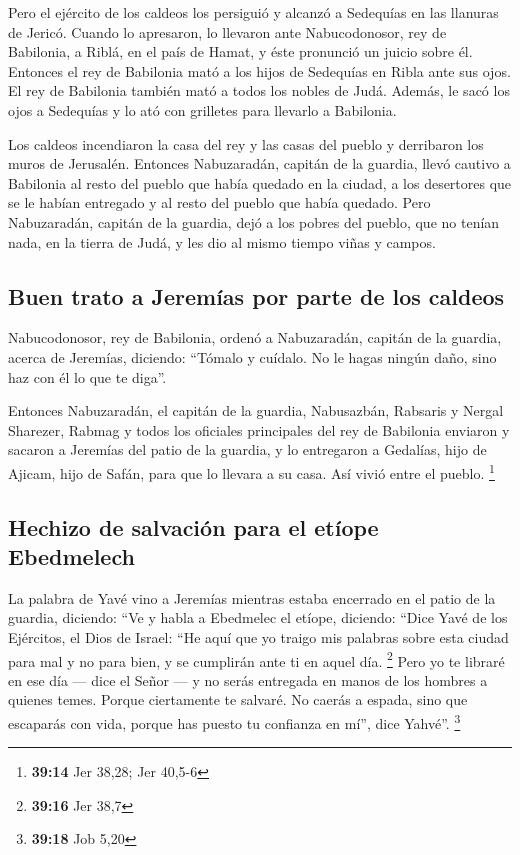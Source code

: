 \begin{paracol}{2}
 Pero el ejército de los caldeos los persiguió y alcanzó a
Sedequías en las llanuras de Jericó. Cuando lo apresaron, lo llevaron
ante Nabucodonosor, rey de Babilonia, a Riblá, en el país de Hamat, y
éste pronunció un juicio sobre él.  Entonces el rey de
Babilonia mató a los hijos de Sedequías en Ribla ante sus ojos. El rey
de Babilonia también mató a todos los nobles de Judá. 
Además, le sacó los ojos a Sedequías y lo ató con grilletes para
llevarlo a Babilonia.

 Los caldeos incendiaron la casa del rey y las casas del
pueblo y derribaron los muros de Jerusalén.  Entonces
Nabuzaradán, capitán de la guardia, llevó cautivo a Babilonia al resto
del pueblo que había quedado en la ciudad, a los desertores que se le
habían entregado y al resto del pueblo que había quedado.
 Pero Nabuzaradán, capitán de la guardia, dejó a los
pobres del pueblo, que no tenían nada, en la tierra de Judá, y les dio
al mismo tiempo viñas y campos.

\hypertarget{buen-trato-a-jeremuxedas-por-parte-de-los-caldeos}{%
\subsection{Buen trato a Jeremías por parte de los
caldeos}\label{buen-trato-a-jeremuxedas-por-parte-de-los-caldeos}}

 Nabucodonosor, rey de Babilonia, ordenó a Nabuzaradán,
capitán de la guardia, acerca de Jeremías, diciendo: 
``Tómalo y cuídalo. No le hagas ningún daño, sino haz con él lo que te
diga''.

 Entonces Nabuzaradán, el capitán de la guardia,
Nabusazbán, Rabsaris y Nergal Sharezer, Rabmag y todos los oficiales
principales del rey de Babilonia  enviaron y sacaron a
Jeremías del patio de la guardia, y lo entregaron a Gedalías, hijo de
Ajicam, hijo de Safán, para que lo llevara a su casa. Así vivió entre el
pueblo. \footnote{\textbf{39:14} Jer 38,28; Jer 40,5-6}

\hypertarget{hechizo-de-salvaciuxf3n-para-el-etuxedope-ebedmelech}{%
\subsection{Hechizo de salvación para el etíope
Ebedmelech}\label{hechizo-de-salvaciuxf3n-para-el-etuxedope-ebedmelech}}

 La palabra de Yavé vino a Jeremías mientras estaba
encerrado en el patio de la guardia, diciendo:  ``Ve y
habla a Ebedmelec el etíope, diciendo: ``Dice Yavé de los Ejércitos, el
Dios de Israel: ``He aquí que yo traigo mis palabras sobre esta ciudad
para mal y no para bien, y se cumplirán ante ti en aquel día.
\footnote{\textbf{39:16} Jer 38,7}  Pero yo te libraré en
ese día --- dice el Señor --- y no serás entregada en manos de los
hombres a quienes temes.  Porque ciertamente te salvaré.
No caerás a espada, sino que escaparás con vida, porque has puesto tu
confianza en mí'', dice Yahvé''. \footnote{\textbf{39:18} Job 5,20}


\end{paracol}
